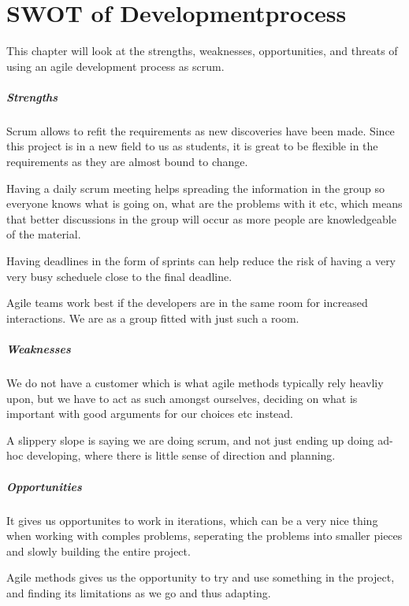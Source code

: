 \chapter{SWOT of Developmentprocess}
This chapter will look at the strengths, weaknesses, opportunities, and threats of using an agile development process as scrum.
\paragraph{Strengths}
\begin{itemize*}
        \item Scrum allows to refit the requirements as new discoveries have been made. Since this project is in a new field to us as students, it is great to be flexible in the requirements as they are almost bound to change.
        \item Having a daily scrum meeting helps spreading the information in the group so everyone knows what is going on, what are the problems with it etc, which means that better discussions in the group will occur as more people are knowledgeable of the material.
        \item Having deadlines in the form of sprints can help reduce the risk of having a very very busy scheduele close to the final deadline.
        \item Agile teams work best if the developers are in the same room for increased interactions. We are as a group fitted with just such a room.
\end{itemize*}
\paragraph{Weaknesses} 
\begin{itemize*}
        \item We do not have a customer which is what agile methods typically rely heavliy upon, but we have to act as such amongst ourselves, deciding on what is important with good arguments for our choices etc instead.
        \item A slippery slope is saying we are doing scrum, and not just ending up doing ad-hoc developing, where there is little sense of direction and planning.
\end{itemize*}
\paragraph{Opportunities} 
\begin{itemize*}
        \item It gives us opportunites to work in iterations, which can be a very nice thing when working with comples problems, seperating the problems into smaller pieces and slowly building the entire project.
        \item Agile methods gives us the opportunity to try and use something in the project, and finding its limitations as we go and thus adapting.
\end{itemize*}
